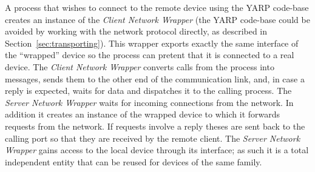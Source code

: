 A process that wishes to connect to the remote device using
the YARP code-base
creates an instance of the \emph{Client Network Wrapper}
(the YARP code-base could be avoided by working with the network
protocol directly, as described in Section~\ref{sec:transporting}).
%
This wrapper exports 
exactly the same interface of the 
``wrapped'' device so the process can pretent that it is connected to 
a real device. The \emph{Client Network Wrapper} converts calls from 
the process into messages, sends them to the other end of the 
communication link, and, in case a reply is expected, waits for data and 
dispatches it to the calling process. 
%
The \emph{Server Network Wrapper} waits for incoming connections from 
the network. 
In addition it creates an instance of the wrapped 
device to which it forwards requests from the network. If requests
involve a reply theses are sent back to the 
calling port so that they are received by the remote client. The 
\emph{Server Network Wrapper} gains access to the local device through its 
interface; as such it is a total independent 
entity that can be reused for devices of the same family.
%




